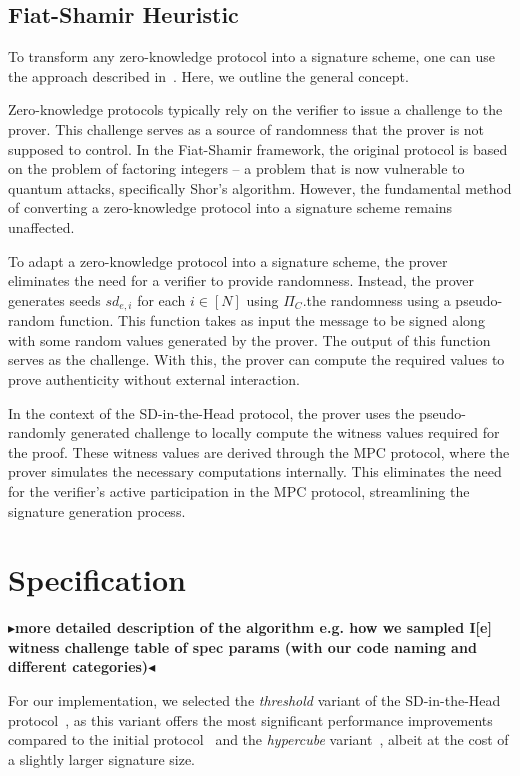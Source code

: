 \documentclass[twoside,11pt]{report}
\theoremstyle{definition}
\theoremstyle{plain}
\newcommand{\todo}[1]{{\color[rgb]{.5,0,0}\textbf{$\blacktriangleright$#1$\blacktriangleleft$}}}
\begin{document}
\section{Fiat-Shamir Heuristic}\label{sec:fiatshamir}
To transform any zero-knowledge protocol into a signature scheme, one can use the approach described in~\cite{fiat1986prove}. Here, we outline the general concept.

Zero-knowledge protocols typically rely on the verifier to issue a challenge to the prover. This challenge serves as a source of randomness that the prover is not supposed to control. In the Fiat-Shamir framework, the original protocol is based on the problem of factoring integers -- a problem that is now vulnerable to quantum attacks, specifically Shor's algorithm. However, the fundamental method of converting a zero-knowledge protocol into a signature scheme remains unaffected.

To adapt a zero-knowledge protocol into a signature scheme, the prover eliminates the need for a verifier to provide randomness. Instead, the prover generates seeds $sd_{e,i}$ for each $i \in [N]$ using $\Pi_C$.the randomness using a pseudo-random function. This function takes as input the message to be signed along with some random values generated by the prover. The output of this function serves as the challenge. With this, the prover can compute the required values to prove authenticity without external interaction.

In the context of the SD-in-the-Head protocol, the prover uses the pseudo-randomly generated challenge to locally compute the witness values required for the proof. These witness values are derived through the MPC protocol, where the prover simulates the necessary computations internally. This eliminates the need for the verifier's active participation in the MPC protocol, streamlining the signature generation process.


\chapter{Specification}\label{ch:spec}

\todo{more detailed description of the algorithm
  e.g. how we sampled I[e] witness challenge
  table of spec params (with our code naming and different categories)}

For our implementation, we selected the \textit{threshold} variant of the SD-in-the-Head protocol~\cite{aguilarsyndrome11,feneuil2023threshold}, as this variant offers the most significant performance improvements compared to the initial protocol~\cite{feneuil2022syndrome} and the \textit{hypercube} variant~\cite{aguilarsyndrome11,aguilar2023return}, albeit at the cost of a slightly larger signature size.
\end{document}
